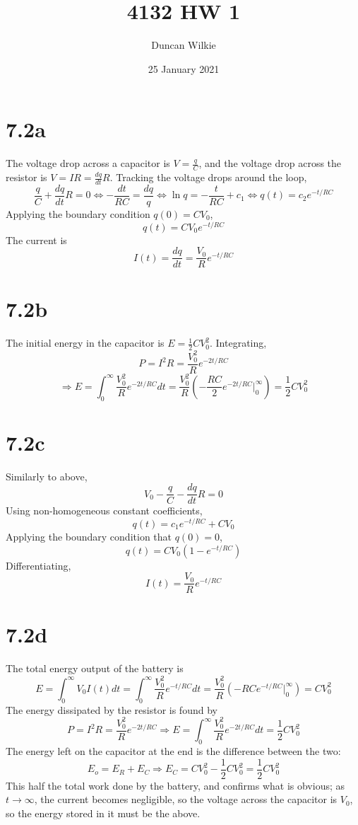 \documentclass{article}
\title{4132 HW 1}
\author{Duncan Wilkie}
\date{25 January 2021}
\begin{document}
\maketitle

\section*{7.2a}
The voltage drop across a capacitor is $ V = \frac{q}{C}$, and the voltage drop across the resistor is $V=IR=\frac{dq}{dt}R$. Tracking the voltage drops around the loop,
\[\frac{q}{C}+\frac{dq}{dt}R=0\Leftrightarrow -\frac{dt}{RC}=\frac{dq}{q}\Leftrightarrow \ln q=-\frac{t}{RC}+c_1\Leftrightarrow q(t)=c_2e^{-{t}/{RC}}\]
Applying the boundary condition $q(0)=CV_0$,
\[q(t)=CV_0e^{-t/RC}\]
The current is
\[I(t)=\frac{dq}{dt}=\frac{V_0}{R}e^{-t/RC}\]

\section*{7.2b}
The initial energy in the capacitor is $E=\frac{1}{2}CV_0^2$. Integrating, \[P=I^2R=\frac{V_0^2}{R}e^{-2t/RC}\]
\[\Rightarrow E=\int_0^\infty\frac{V_0^2}{R}e^{-2t/RC}dt=\frac{V_0^2}{R}\left( -\frac{RC}{2}e^{-2t/RC}\bigg|_0^\infty \right)=\frac{1}{2}CV_0^2\]

\section*{7.2c}
Similarly to above,
\[V_0-\frac{q}{C}-\frac{dq}{dt}R=0\]
Using non-homogeneous constant coefficients,
\[q(t)=c_1e^{-t/RC}+CV_0\]
Applying the boundary condition that $q(0)=0$,
\[q(t)=CV_0(1-e^{-t/RC})\]
Differentiating,
\[I(t)=\frac{V_0}{R}e^{-t/RC}\]

\section*{7.2d}
The total energy output of the battery is
\[E=\int_0^\infty V_0I(t)dt=\int_0^\infty \frac{V_0^2}{R}e^{-t/RC}dt=\frac{V_0^2}{R}\left( -RCe^{-t/RC}\bigg|_0^\infty \right)=C{V_0^2}\]
The energy dissipated by the resistor is found by
\[P=I^2R=\frac{V_0^2}{R}e^{-2t/RC}\Rightarrow E=\int_0^\infty \frac{V_0^2}{R}e^{-2t/RC}dt=\frac{1}{2}CV_0^2\]
The energy left on the capacitor at the end is the difference between the two:
\[E_o=E_R+E_C\Rightarrow E_C=CV_0^2-\frac{1}{2}CV_0^2=\frac{1}{2}CV_0^2\]
This half the total work done by the battery, and confirms what is obvious; as $t\to\infty$, the current becomes negligible, so the voltage across the capacitor is $V_0$, so the energy stored in it must be the above.
\end{document}
